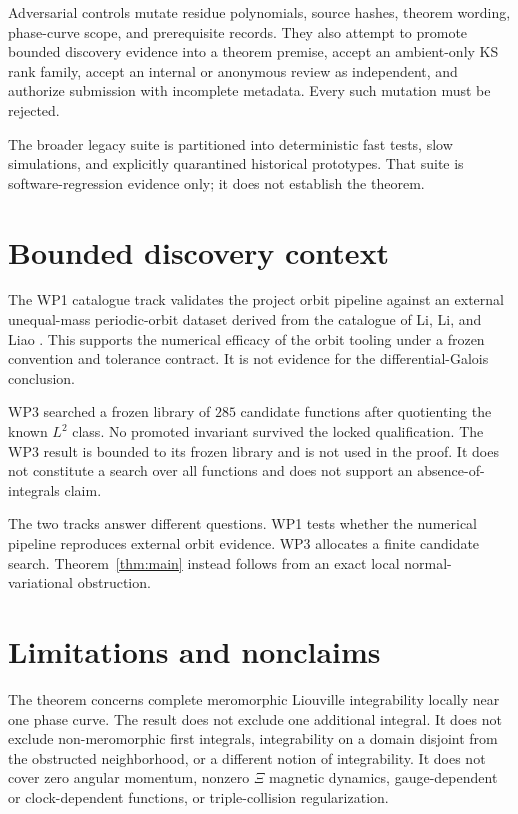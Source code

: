 \documentclass[11pt]{article}
\theoremstyle{definition}
\theoremstyle{remark}
\newcommand{\XiMap}{\Xi}
\begin{document}
Adversarial controls mutate residue polynomials, source hashes, theorem
wording, phase-curve scope, and prerequisite records.  They also attempt to
promote bounded discovery evidence into a theorem premise, accept an
ambient-only KS rank family, accept an internal or anonymous review as
independent, and authorize submission with incomplete metadata.  Every such
mutation must be rejected.

The broader legacy suite is partitioned into deterministic fast tests, slow
simulations, and explicitly quarantined historical prototypes.  That suite
is software-regression evidence only; it does not establish the theorem.

\section{Bounded discovery context}
\label{sec:context}

The WP1 catalogue track validates the project orbit pipeline against an
external unequal-mass periodic-orbit dataset derived from the catalogue of
Li, Li, and Liao \cite{lililiao2021}.  This supports the numerical efficacy
of the orbit tooling under a frozen convention and tolerance contract.  It is
not evidence for the differential-Galois conclusion.

WP3 searched a frozen library of \(285\) candidate functions after quotienting
the known \(L^2\) class.  No promoted invariant survived the locked
qualification.  The WP3 result is bounded to its frozen library and is not
used in the proof.  It does not constitute a search over all functions and
does not support an absence-of-integrals claim.

The two tracks answer different questions.  WP1 tests whether the numerical
pipeline reproduces external orbit evidence.  WP3 allocates a finite
candidate search.  Theorem~\ref{thm:main} instead follows from an exact local
normal-variational obstruction.

\section{Limitations and nonclaims}
\label{sec:limitations}

The theorem concerns complete meromorphic Liouville integrability locally
near one phase curve.  The result does not exclude one additional integral.
It does not exclude non-meromorphic first integrals, integrability on a
domain disjoint from the obstructed neighborhood, or a different notion of
integrability.  It does not cover zero angular momentum, nonzero
\(\XiMap\) magnetic dynamics, gauge-dependent or clock-dependent functions,
or triple-collision regularization.
\end{document}
